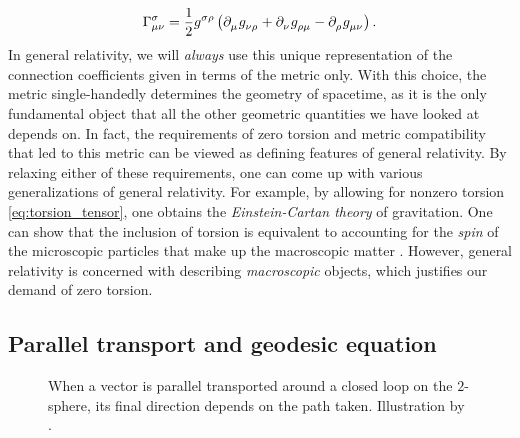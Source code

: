 \begin{equation}
	\Gamma^\sigma_{\mu \nu} = \frac{1}{2} g\indices{^\sigma^\rho} \left(
		\partial\indices{_\mu} g\indices{_\nu_\rho} +
		\partial\indices{_\nu} g\indices{_\rho_\mu} -
		\partial\indices{_\rho} g\indices{_\mu_\nu}
	\right) .
	\label{eq:def_christoffel}
\end{equation}
In general relativity, we will \emph{always} use this unique representation of the connection coefficients given in terms of the metric only.
With this choice, the metric single-handedly determines the geometry of spacetime, as it is the only fundamental object that all the other geometric quantities we have looked at depends on.
In fact, the requirements of zero torsion and metric compatibility that led to this metric can be viewed as defining features of general relativity.
By relaxing either of these requirements, one can come up with various generalizations of general relativity.
For example, by allowing for nonzero torsion \eqref{eq:torsion_tensor}, one obtains the \emph{Einstein-Cartan theory} of gravitation.
One can show that the inclusion of torsion is equivalent to accounting for the \emph{spin} of the microscopic particles that make up the macroscopic matter \cite{ref:hehl}.
However, general relativity is concerned with describing \emph{macroscopic} objects, which justifies our demand of zero torsion.

\iffalse
\begin{align}
	\nabla_c T\indices{^{a_1 \ldots a_r}_{b_1 \ldots b_s}} &= \partial_c {T^{a_1 \ldots a_r}}_{b_1 \ldots b_s} \\
	                                                       &+ \Gamma^{a_1}_{dc} T\indices{^{d a_2 \ldots a_r}_{b_1 \ldots b_s}} + \dots + \Gamma^{a_r}_{dc} T\indices{^{a_1 \ldots a_{r-1}d}_{b_1 \ldots b_s}} \\
	                                                       &- {\Gamma^d}_{b_1 c} {T^{a_1 \ldots a_r}}_{d b_2 \ldots b_s} - \cdots - {\Gamma^d}_{b_s c} {T^{a_1 \ldots a_r}}_{b_1 \ldots b_{s-1} d}.
	\label{eq:def_cov_deriv}
\end{align}
\fi

\subsection{Parallel transport and geodesic equation}
\label{sec:geodesic}

\begin{figure}
\centering

\caption{\label{fig:parallel_transport}When a vector is parallel transported around a closed loop on the $2$-sphere, its final direction depends on the path taken. Illustration by \cite{ref:figure_parallel_transport}. }
\end{figure}


